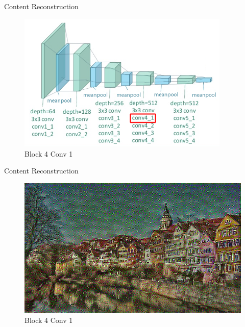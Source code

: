 \documentclass{beamer}
\begin{document}
\begin{frame}{Content Reconstruction}
\begin{figure}[ht]
\centering
\caption{Block 4 Conv 1}
\includegraphics[width=0.9\textwidth]{img/vgg19/content/block4_conv1}
\end{figure}
\end{frame}
\begin{frame}{Content Reconstruction}
\begin{figure}[ht]
\centering
\caption{Block 4 Conv 1}
\includegraphics[width=\textwidth]{img/content/block4_conv1.png}
\end{figure}
\end{frame}
\end{document}

